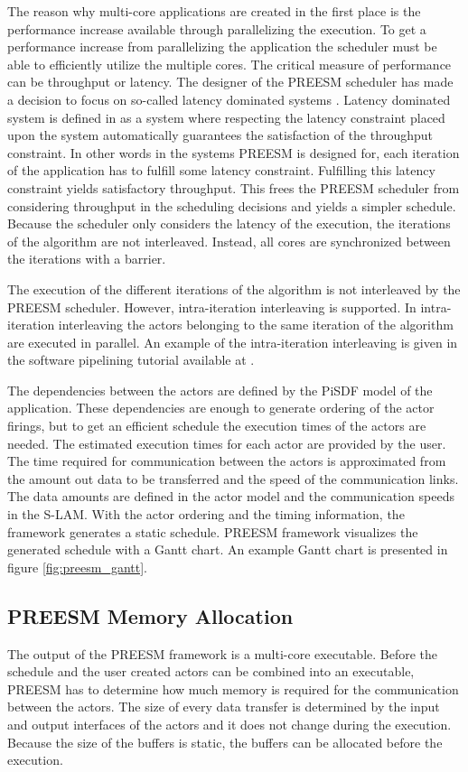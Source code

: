 The reason why multi-core applications are created in the first place is the performance increase available through parallelizing the execution. To get a performance increase from parallelizing the application the scheduler must be able to efficiently utilize the multiple cores. The critical measure of performance can be throughput or latency. The designer of the PREESM scheduler has made a decision to focus on so-called latency dominated systems \cite{pelcat2014preesm}. Latency dominated system is defined in \cite{ghamarian2006throughput} as a system where respecting the latency constraint placed upon the system automatically guarantees the satisfaction of the throughput constraint. In other words in the systems PREESM is designed for, each iteration of the application has to fulfill some latency constraint. Fulfilling this latency constraint yields satisfactory throughput. This frees the PREESM scheduler from considering throughput in the scheduling decisions and yields a simpler schedule. Because the scheduler only considers the latency of the execution, the iterations of the algorithm are not interleaved. Instead, all cores are synchronized between the iterations with a barrier.~\cite{pelcat2014preesm}

The execution of the different iterations of the algorithm is not interleaved by the PREESM scheduler. However, intra-iteration interleaving is supported. In intra-iteration interleaving the actors belonging to the same iteration of the algorithm are executed in parallel. \cite{pelcat2014preesm} An example of the intra-iteration interleaving is given in the software pipelining tutorial available at \cite{preesm}.

The dependencies between the actors are defined by the PiSDF model of the application. These dependencies are enough to generate ordering of the actor firings, but to get an efficient schedule the execution times of the actors are needed. The estimated execution times for each actor are provided by the user. The time required for communication between the actors is approximated from the amount out data to be transferred and the speed of the communication links. The data amounts are defined in the actor model and the communication speeds in the S-LAM. With the actor ordering and the timing information, the framework generates a static schedule. \cite{pelcat2014preesm} PREESM framework visualizes the generated schedule with a Gantt chart. An example Gantt chart is presented in figure \ref{fig:preesm_gantt}.

\subsection{PREESM Memory Allocation}
\label{sec:preesm-codegen}
The output of the PREESM framework is a multi-core executable. Before the schedule and the user created actors can be combined into an executable, PREESM has to determine how much memory is required for the communication between the actors. The size of every data transfer is determined by the input and output interfaces of the actors and it does not change during the execution. Because the size of the buffers is static, the buffers can be allocated before the execution.~\cite{desnos2012memory}

